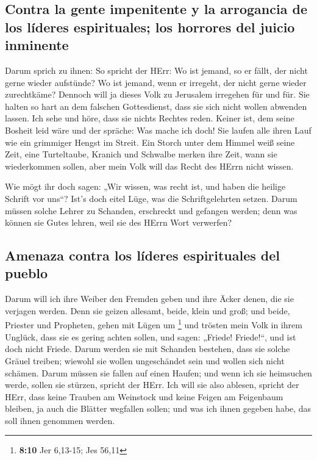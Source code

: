 \hypertarget{contra-la-gente-impenitente-y-la-arrogancia-de-los-luxedderes-espirituales-los-horrores-del-juicio-inminente}{%
\subsection{Contra la gente impenitente y la arrogancia de los líderes
espirituales; los horrores del juicio
inminente}\label{contra-la-gente-impenitente-y-la-arrogancia-de-los-luxedderes-espirituales-los-horrores-del-juicio-inminente}}

 Darum sprich zu ihnen: So spricht der HErr: Wo ist
jemand, so er fällt, der nicht gerne wieder aufstünde? Wo ist jemand,
wenn er irregeht, der nicht gerne wieder zurechtkäme? 
Dennoch will ja dieses Volk zu Jerusalem irregehen für und für. Sie
halten so hart an dem falschen Gottesdienst, dass sie sich nicht wollen
abwenden lassen.  Ich sehe und höre, dass sie nichts
Rechtes reden. Keiner ist, dem seine Bosheit leid wäre und der spräche:
Was mache ich doch! Sie laufen alle ihren Lauf wie ein grimmiger Hengst
im Streit.  Ein Storch unter dem Himmel weiß seine Zeit,
eine Turteltaube, Kranich und Schwalbe merken ihre Zeit, wann sie
wiederkommen sollen, aber mein Volk will das Recht des HErrn nicht
wissen.

 Wie mögt ihr doch sagen: „Wir wissen, was recht ist, und
haben die heilige Schrift vor uns``? Ist's doch eitel Lüge, was die
Schriftgelehrten setzen.  Darum müssen solche Lehrer zu
Schanden, erschreckt und gefangen werden; denn was können sie Gutes
lehren, weil sie des HErrn Wort verwerfen?

\hypertarget{amenaza-contra-los-luxedderes-espirituales-del-pueblo}{%
\subsection{Amenaza contra los líderes espirituales del
pueblo}\label{amenaza-contra-los-luxedderes-espirituales-del-pueblo}}

 Darum will ich ihre Weiber den Fremden geben und ihre
Äcker denen, die sie verjagen werden. Denn sie geizen allesamt, beide,
klein und groß; und beide, Priester und Propheten, gehen mit Lügen um
\footnote{\textbf{8:10} Jer 6,13-15; Jes 56,11}  und
trösten mein Volk in ihrem Unglück, dass sie es gering achten sollen,
und sagen: „Friede! Friede!{}``, und ist doch nicht Friede.
 Darum werden sie mit Schanden bestehen, dass sie solche
Gräuel treiben; wiewohl sie wollen ungeschändet sein und wollen sich
nicht schämen. Darum müssen sie fallen auf einen Haufen; und wenn ich
sie heimsuchen werde, sollen sie stürzen, spricht der HErr.
 Ich will sie also ablesen, spricht der HErr, dass keine
Trauben am Weinstock und keine Feigen am Feigenbaum bleiben, ja auch die
Blätter wegfallen sollen; und was ich ihnen gegeben habe, das soll ihnen
genommen werden.

